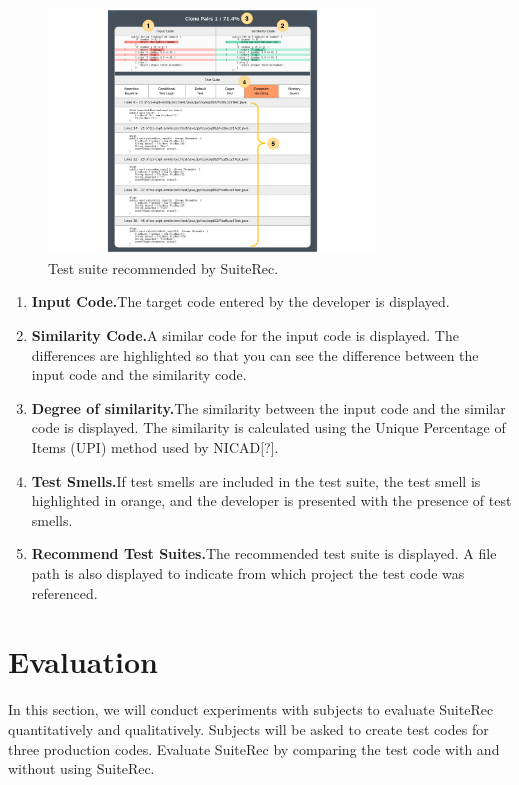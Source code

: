 \documentclass[conference]{IEEEtran}
\begin{document}
\begin{figure}[htbp]
\centerline{\includegraphics[width=8.7cm]{SuiteRec.pdf}}
\caption{Test suite recommended by SuiteRec.}
\label{fig}
\end{figure}

 \begin{enumerate}
\renewcommand{\labelenumi}{(\arabic{enumi})}
\item{\textbf{Input Code.}The target code entered by the developer is displayed.}
\item{\textbf{Similarity Code.}A similar code for the input code is displayed. The differences are highlighted so that you can see the difference between the input code and the similarity code.}
\item{\textbf{Degree of similarity.}The similarity between the input code and the similar code is displayed. The similarity is calculated using the Unique Percentage of Items (UPI) method used by NICAD[?].}
\item{\textbf{Test Smells.}If test smells are included in the test suite, the test smell is highlighted in orange, and the developer is presented with the presence of test smells.}
\item{\textbf{Recommend Test Suites.}The recommended test suite is displayed. A file path is also displayed to indicate from which project the test code was referenced.}
\end{enumerate}


\section{Evaluation}
In this section, we will conduct experiments with subjects to evaluate SuiteRec quantitatively and qualitatively. Subjects will be asked to create test codes for three production codes. Evaluate SuiteRec by comparing the test code with and without using SuiteRec. 
\end{document}
